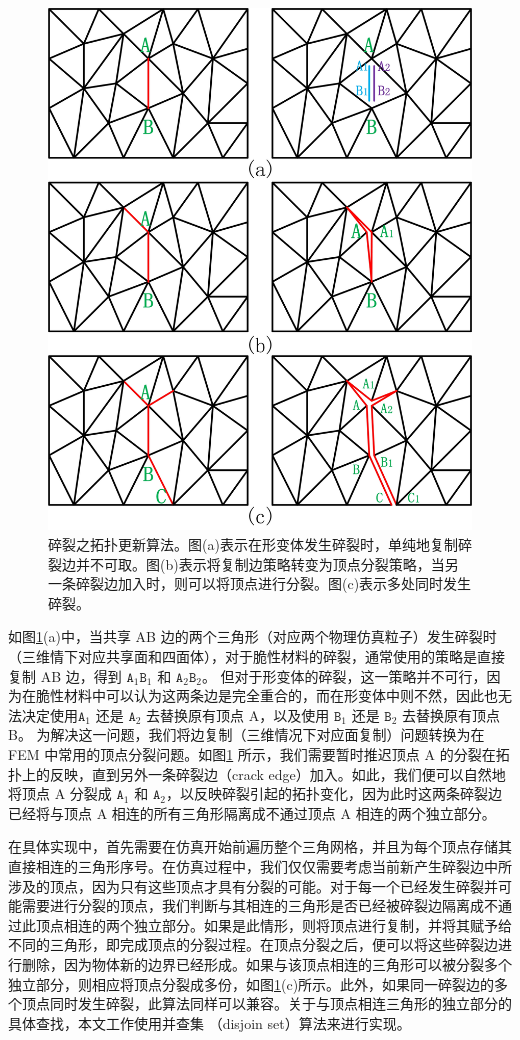 \begin{figure}[!htb]
  \centering
  \captionsetup{justification=centering}
  \includegraphics[width=0.6\linewidth]{chap/image/topology_control}
  \caption{\label{topology_control}
           碎裂之拓扑更新算法。图(a)表示在形变体发生碎裂时，单纯地复制碎裂边并不可取。图(b)表示将复制边策略转变为顶点分裂策略，当另一条碎裂边加入时，则可以将顶点进行分裂。图(c)表示多处同时发生碎裂。
          }
\end{figure}

如图\ref{topology_control}(a)中，当共享 AB 边的两个三角形（对应两个物理仿真粒子）发生碎裂时（三维情下对应共享面和四面体），对于脆性材料的碎裂，通常使用的策略是直接复制 AB 边，得到 $\texttt{A}_1\texttt{B}_1$ 和 $\texttt{A}_2\texttt{B}_2$。 但对于形变体的碎裂，这一策略并不可行，因为在脆性材料中可以认为这两条边是完全重合的，而在形变体中则不然，因此也无法决定使用$\texttt{A}_1$ 还是 $\texttt{A}_2$ 去替换原有顶点 A，以及使用 $\texttt{B}_1$ 还是 $\texttt{B}_2$ 去替换原有顶点 B。 为解决这一问题，我们将边复制（三维情况下对应面复制）问题转换为在 FEM 中常用的顶点分裂问题。如图\ref{topology_control} 所示，我们需要暂时推迟顶点 A 的分裂在拓扑上的反映，直到另外一条碎裂边（crack edge）加入。如此，我们便可以自然地将顶点 A 分裂成 $\texttt{A}_1$ 和 $\texttt{A}_2$，以反映碎裂引起的拓扑变化，因为此时这两条碎裂边已经将与顶点 A 相连的所有三角形隔离成不通过顶点 A 相连的两个独立部分。

在具体实现中，首先需要在仿真开始前遍历整个三角网格，并且为每个顶点存储其直接相连的三角形序号。在仿真过程中，我们仅仅需要考虑当前新产生碎裂边中所涉及的顶点，因为只有这些顶点才具有分裂的可能。对于每一个已经发生碎裂并可能需要进行分裂的顶点，我们判断与其相连的三角形是否已经被碎裂边隔离成不通过此顶点相连的两个独立部分。如果是此情形，则将顶点进行复制，并将其赋予给不同的三角形，即完成顶点的分裂过程。在顶点分裂之后，便可以将这些碎裂边进行删除，因为物体新的边界已经形成。如果与该顶点相连的三角形可以被分裂多个独立部分，则相应将顶点分裂成多份，如图\ref{topology_control}(c)所示。此外，如果同一碎裂边的多个顶点同时发生碎裂，此算法同样可以兼容。关于与顶点相连三角形的独立部分的具体查找，本文工作使用并查集 （disjoin set）算法来进行实现。

